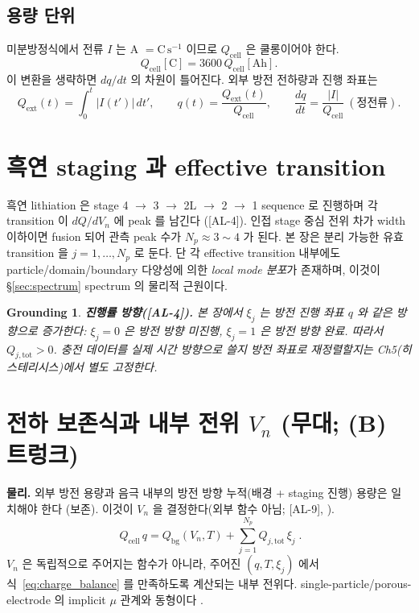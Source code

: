 \documentclass[11pt,a4paper]{article}
\newtheorem*{groundingbox}{Grounding}
\newcommand{\tot}{\mathrm{tot}}
\newcommand{\bg}{\mathrm{bg}}
\newcommand{\cell}{\mathrm{cell}}
\newcommand{\ext}{\mathrm{ext}}
\newcommand{\Ah}{\mathrm{Ah}}
\newcommand{\Cunit}{\mathrm{C}}
\newcommand{\AL}[1]{\textsf{[AL-#1]}}
\begin{document}
\subsection{용량 단위}
미분방정식에서 전류 $I$ 는 A $=\mathrm{C\,s^{-1}}$ 이므로 $Q_\cell$ 은 쿨롱이어야 한다.
\begin{equation}
Q_\cell[\Cunit]=3600\,Q_\cell[\Ah].
\label{eq:unit}
\end{equation}
이 변환을 생략하면 $dq/dt$ 의 차원이 틀어진다. 외부 방전 전하량과 진행 좌표는
\begin{equation}
Q_\ext(t)=\int_0^t |I(t')|\,dt',\qquad q(t)=\frac{Q_\ext(t)}{Q_\cell},\qquad
\frac{dq}{dt}=\frac{|I|}{Q_\cell}\ (\text{정전류}).
\label{eq:dqdt}
\end{equation}

\section{흑연 staging 과 effective transition}\label{sec:staging}
흑연 lithiation 은 stage 4 $\to$ 3 $\to$ 2L $\to$ 2 $\to$ 1 sequence 로 진행하며 각 transition 이
$dQ/dV_n$ 에 peak 를 남긴다 \cite{dahn1991,ohzuku1993,funabiki1999}(\AL{4}). 인접 stage 중심 전위
차가 width 이하이면 fusion 되어 관측 peak 수가 $N_p\approx3\sim4$ 가 된다. 본 장은 분리 가능한 유효
transition 을 $j=1,\dots,N_p$ 로 둔다. 단 각 effective transition 내부에도 particle/domain/boundary
다양성에 의한 \emph{local mode 분포}가 존재하며, 이것이 \S\ref{sec:spectrum} spectrum 의 물리적 근원이다.
\begin{groundingbox}
\textbf{진행률 방향(\AL{4}).} 본 장에서 $\xi_j$ 는 방전 진행 좌표 $q$ 와 같은 방향으로 증가한다:
$\xi_j=0$ 은 방전 방향 미진행, $\xi_j=1$ 은 방전 방향 완료. 따라서 $Q_{j,\tot}>0$. 충전 데이터를
실제 시간 방향으로 쓸지 방전 좌표로 재정렬할지는 Ch5(히스테리시스)에서 별도 고정한다.
\end{groundingbox}

\section{전하 보존식과 내부 전위 $V_n$ (무대; (B) 트렁크)}\label{sec:charge}
\textbf{물리.} 외부 방전 용량과 음극 내부의 방전 방향 누적(배경 + staging 진행) 용량은 일치해야 한다
(보존). 이것이 $V_n$ 을 결정한다(외부 함수 아님; \AL{9}, \cite{doyle1993,newman}).
\begin{equation}
\boxed{\;Q_\cell\,q = Q_\bg(V_n,T) + \sum_{j=1}^{N_p} Q_{j,\tot}\,\xi_j\;.}
\label{eq:charge_balance}
\end{equation}
$V_n$ 은 독립적으로 주어지는 함수가 아니라, 주어진 $(q,T,\xi_j)$ 에서 식~\eqref{eq:charge_balance} 를
만족하도록 계산되는 내부 전위다. single-particle/porous-electrode 의 implicit $\mu$ 관계와 동형이다
\cite{doyle1993,newman}.
\end{document}
